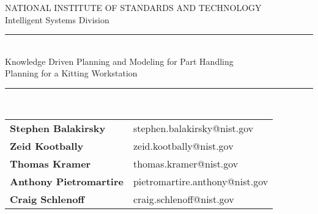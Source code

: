\begin{titlepage}
\begin{center}

\LARGE{NATIONAL INSTITUTE OF STANDARDS AND TECHNOLOGY}\\
\vspace{1.5cm} %
\Large{Intelligent Systems Division}\\


\vspace{2cm} %
\rule[1ex]{1\textwidth}{0.3mm} \\%
\Huge{Knowledge Driven Planning and Modeling for Part Handling}\\
\vspace{1cm} %
\huge{Planning for a Kitting Workstation}\\
\rule[1ex]{1\textwidth}{0.3mm} \\%


\vspace{4.0cm} %

\begin{normalsize}
\begin{tabular}{l l}
\textbf{Stephen Balakirsky} & stephen.balakirsky@nist.gov  \\
\textbf{Zeid Kootbally} & zeid.kootbally@nist.gov\\
\textbf{Thomas Kramer} & thomas.kramer@nist.gov\\
\textbf{Anthony Pietromartire} & pietromartire.anthony@nist.gov\\
\textbf{Craig Schlenoff} & craig.schlenoff@nist.gov 
\end{tabular}
\end{normalsize}
\vspace{1.0cm}
\date{\today}
\end{center}
\end{titlepage}
\cleardoublepage

